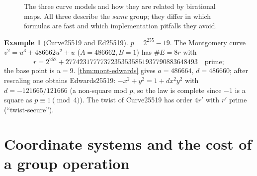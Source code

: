 \documentclass[11pt,a4paper,oneside]{book}
\theoremstyle{plain}
\theoremstyle{definition}
\newtheorem{example}[theorem]{Example}
\theoremstyle{remark}
\begin{document}
\begin{figure}[ht]
\centering
{}
\caption{The three curve models and how they are related by birational maps. All three describe the \emph{same} group; they differ in which formulas are fast and which implementation pitfalls they avoid.}
\label{fig:models}
\end{figure}

\begin{example}[Curve25519 and Ed25519]
$p=2^{255}-19$. The Montgomery curve $v^2=u^3+486662u^2+u$ ($A=486662,B=1$) has $\#E=8r$ with
\[r=2^{252}+27742317777372353535851937790883648493\quad\text{prime};\]
the base point is $u=9$.
\cref{thm:mont-edwards} gives $a=486664$, $d=486660$; after rescaling one obtains Edwards25519: $-x^2+y^2=1+dx^2y^2$ with $d=-121665/121666$ (a non-square mod $p$, so the law is complete since $-1$ is a square as $p\equiv1\pmod4$). The twist of Curve25519 has order $4r'$ with $r'$ prime (``twist-secure'').
\end{example}

\section{Coordinate systems and the cost of a group operation}
\end{document}
